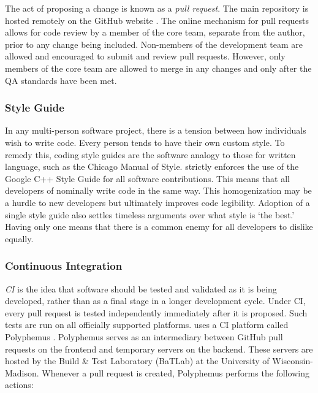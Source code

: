The act of proposing a change is known as a \emph{pull request}. The main \Cyclus repository is 
hosted remotely on the GitHub website \cite{dabbish_social_2012}. The online
mechanism for pull requests allows for code review by a member of the \Cyclus 
core team, separate from the author, prior to any change being included. Non-members
of the \Cyclus development team are allowed and encouraged to submit and review 
pull requests. However, only members of the \Cyclus core team are allowed to 
merge in any changes and only after the \gls{QA} standards have been met.

\subsubsection{Style Guide}

In any multi-person software project, there is a tension between how individuals
wish to write code. Every person tends to have their own custom style. To remedy this,
coding style guides are the software analogy to those for written language,
such as the Chicago Manual of Style. \Cyclus strictly enforces the use of the 
Google C++ Style Guide \cite{weinberger_google_2008} for all software contributions.
This means that all developers of \Cyclus nominally write \Cyclus code in the same 
way.  This homogenization may be a hurdle to new developers but ultimately 
improves code legibility. Adoption of a single style guide also settles
timeless arguments over what style is `the best.' Having only one means that 
there is a common enemy for all developers to dislike equally.

\subsubsection{Continuous Integration}
\label{sec:qa-ci}

\emph{\acrfull{CI}} is the idea that software should be tested and validated 
as it is being developed, rather than as a final stage in a longer development 
cycle.  Under \gls{CI}, every pull request is tested independently immediately after 
it is proposed. Such tests are run on all officially supported platforms. 
\Cyclus uses a \gls{CI} platform called Polyphemus \cite{scopatz_polyphemus_2014}. Polyphemus serves as an intermediary between GitHub pull requests on the frontend 
and temporary \Cyclus servers on the backend. These servers are hosted by 
the Build \& Test Laboratory (BaTLab) \cite{uw_batlab_team_batlab_2014} at the University of 
Wisconsin-Madison. Whenever a pull request is created, Polyphemus performs 
the following actions:

